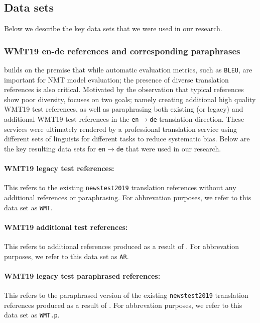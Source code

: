\documentclass[11pt,a4paper]{article}
\begin{document}
\subsection{Data sets}

Below we describe the key data sets that we were used in our research.

\subsubsection{WMT19 en-de references and corresponding paraphrases}

\citet{freitag-bleu-paraphrase-references-2020} builds on the premise that while automatic evaluation metrics, such as \texttt{BLEU}, are important for NMT model evaluation; the presence of diverse translation references is also critical. Motivated by the observation that typical references show poor diversity, \citet{freitag-bleu-paraphrase-references-2020} focuses on two goals; namely creating additional high quality WMT19 test references, as well as paraphrasing both existing (or legacy) and additional WMT19 test references in the \texttt{en$\rightarrow$de} translation direction. These services were ultimately rendered by a professional translation service using different sets of linguists for different tasks to reduce systematic bias. Below are the key resulting data sets for \texttt{en$\rightarrow$de} that were used in our research.

\paragraph{WMT19 legacy test references:} This refers to the existing \texttt{newstest2019} translation references without any additional references or paraphrasing. For abbrevation purposes, we refer to this data set as \texttt{WMT}. 

\paragraph{WMT19 additional test references:} This refers to additional references produced as a result of \citet{freitag-bleu-paraphrase-references-2020}. For abbrevation purposes, we refer to this data set as \texttt{AR}. 

\paragraph{WMT19 legacy test paraphrased references:} This refers to the paraphrased version of the existing \texttt{newstest2019} translation references produced as a result of \citet{freitag-bleu-paraphrase-references-2020}. For abbrevation purposes, we refer to this data set as \texttt{WMT.p}. 
\end{document}
